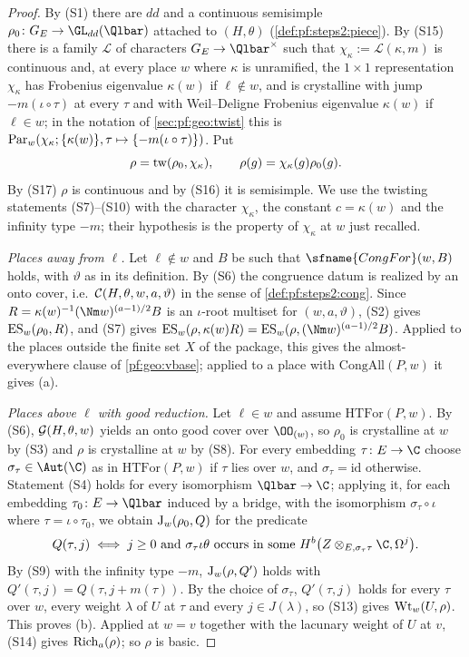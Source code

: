\begin{proof}
By (S1) there are $dd$ and a continuous semisimple $\rho_0\colon G_E\to\GL_{dd}(\Qlbar)$ attached to
$(H,\theta)$ (\cref{def:pf:steps2:piece}). By (S15) there is a family $\mathcal L$ of characters
$G_E\to\Qlbar^\times$ such that $\chi_\kappa:=\mathcal L(\kappa,m)$ is continuous and, at every place $w$
where $\kappa$ is unramified, the $1\times1$ representation $\chi_\kappa$ has Frobenius eigenvalue
$\kappa(w)$ if $\ell\notin w$, and is crystalline with jump $-m(\iota\circ\tau)$ at every $\tau$ and with
Weil--Deligne Frobenius eigenvalue $\kappa(w)$ if $\ell\in w$; in the notation of \cref{sec:pf:geo:twist}
this is $\mathrm{Par}_w(\chi_\kappa;\{\kappa(w)\},\tau\mapsto\{-m(\iota\circ\tau)\})$. Put
\[
  \rho=\mathrm{tw}(\rho_0,\chi_\kappa),\qquad \rho(g)=\chi_\kappa(g)\rho_0(g).
\]
By (S17) $\rho$ is continuous and by (S16) it is semisimple. We use the twisting statements
(S7)--(S10) with the character $\chi_\kappa$, the constant $c=\kappa(w)$ and the infinity type
$-m$; their hypothesis is the property of $\chi_\kappa$ at $w$ just recalled.

\emph{Places away from $\ell$.} Let $\ell\notin w$ and $B$ be such that $\sfname{CongFor}(w,B)$ holds,
with $\vartheta$ as in its definition. By (S6) the congruence datum is realized by an onto cover, i.e.\
$\mathcal{C}(H,\theta,w,a,\vartheta)$ in the sense of \cref{def:pf:steps2:cong}. Since
$R=\kappa(w)^{-1}(\Nm w)^{(a-1)/2}B$ is an $\iota$-root multiset for $(w,a,\vartheta)$, (S2) gives
$\mathrm{ES}_w(\rho_0,R)$, and (S7) gives $\geoES_w(\rho,\kappa(w)R)=\geoES_w(\rho,(\Nm w)^{(a-1)/2}B)$.
Applied to the places outside the finite set $X$ of the package, this gives the almost-everywhere
clause of \cref{pf:geo:vbase}; applied to a place with $\mathrm{CongAll}(P,w)$ it gives (a).

\emph{Places above $\ell$ with good reduction.} Let $\ell\in w$ and assume $\mathrm{HTFor}(P,w)$. By (S6),
$\mathcal{G}(H,\theta,w)$ yields an onto good cover over $\OO_{(w)}$, so $\rho_0$ is crystalline at $w$ by
(S3) and $\rho$ is crystalline at $w$ by (S8). For every embedding $\tau\colon E\to\C$ choose
$\sigma_\tau\in\Aut(\C)$ as in $\mathrm{HTFor}(P,w)$ if $\tau$ lies over $w$, and $\sigma_\tau=\mathrm{id}$
otherwise. Statement (S4) holds for every isomorphism $\Qlbar\to\C$; applying it, for each embedding
$\tau_0\colon E\to\Qlbar$ induced by a bridge, with the isomorphism $\sigma_\tau\circ\iota$ where
$\tau=\iota\circ\tau_0$, we obtain $\mathrm{J}_w(\rho_0,Q)$ for the predicate
\[
  Q(\tau,j)\iff j\ge0\text{ and }\sigma_\tau\iota\theta\text{ occurs in some }
  \geoHdg{Z\otimes_{E,\sigma_\tau\tau}\C}{j}{b}.
\]
By (S9) with the infinity type $-m$, $\mathrm{J}_w(\rho,Q')$ holds with $Q'(\tau,j)=Q(\tau,j+m(\tau))$. By the
choice of $\sigma_\tau$, $Q'(\tau,j)$ holds for every $\tau$ over $w$, every weight $\lambda$ of $U$ at $\tau$
and every $j\in J(\lambda)$, so (S13) gives $\mathrm{Wt}_w(U,\rho)$. This proves (b). Applied at $w=v$
together with the lacunary weight of $U$ at $v$, (S14) gives $\mathrm{Rich}_a(\rho)$; so $\rho$ is basic.


\end{proof}
